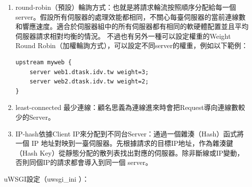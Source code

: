 \documentclass[14pt,a4paper]{report}  %
\begin{document}
\begin{enumerate}
\item round-robin（預設）輪詢方式：也就是將請求輪流按照順序分配給每一個 server。假設所有伺服器的處理效能都相同，不關心每臺伺服器的當前連線數和響應速度。適合於伺服器組中的所有伺服器都有相同的軟硬體配置並且平均伺服器請求相對均衡的情況。
不過也有另外一種可以設定權重的Weight Round Robin（加權輪詢方式），可以設定不同server的權重，例如以下範例：
\begin{lstlisting}[caption=\Large\sectionef 設定不同 server 的權重]
  upstream myweb {
    server web1.dtask.idv.tw weight=3;
    server web2.dtask.idv.tw weight=2;
}
\end{lstlisting}
\item least-connected 最少連線：顧名思義為連線進來時會把Request導向連線數較少的Server。
\item IP-hash依據Client IP來分配到不同台Server：通過一個雜湊（Hash）函式將一個 IP 地址對映到一臺伺服器。先根據請求的目標IP地址，作為雜湊鍵（Hash Key）從靜態分配的散列表找出對應的伺服器。除非斷線或IP變動，否則同個IP的請求都會導入到同一個 server。
\end{enumerate}
  uWSGI設定（uwsgi\_ini ）：\\
\end{document}

